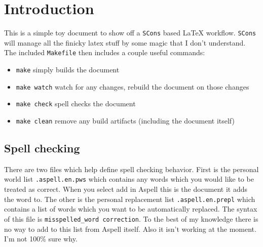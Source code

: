 \section{Introduction}
This is a simple toy document to show off a \texttt{SCons} based \LaTeX{} workflow.
\texttt{SCons} will manage all the finicky latex stuff by some magic that I don't
understand. The included \texttt{Makefile} then includes a couple useful commands:
\begin{itemize}
  \item
   \texttt{make} simply builds the document
  \item
    \texttt{make watch} watch for any changes, rebuild the document on those changes
  \item
    \texttt{make check} spell checks the document
  \item
    \texttt{make clean} remove any build artifacts (including the document itself)
\end{itemize}

\subsection{Spell checking}

There are two files which help define spell checking behavior. First is the
personal world list \texttt{.aspell.en.pws} which contains any words which you
would like to be treated as correct. When you select add in Aspell this is the
document it adds the word to. The other is the personal replacement list
\texttt{.aspell.en.prepl} which contains a list of words which you want to be
automatically replaced. The syntax of this file is \texttt{misspelled\_word
correction}. To the best of my knowledge there is no way to add to this list
from Aspell itself. Also it isn't working at the moment. I'm not 100\% sure why.
